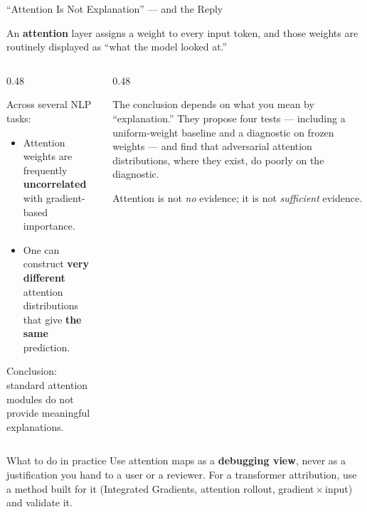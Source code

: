 \begin{frame}{``Attention Is Not Explanation'' --- and the Reply}

    {\scriptsize An \textbf{attention} layer assigns a weight to every input token, and those weights
    are routinely displayed as ``what the model looked at.''}

    \begin{columns}[T]
        \begin{column}{0.48\textwidth}
            \begin{tcolorbox}[colback=raiRed!5, colframe=raiRed!70,
                              title=Jain \& Wallace (NAACL 2019)]
                \scriptsize
                Across several NLP tasks:
                \begin{itemize}
                    \item Attention weights are frequently \textbf{uncorrelated} with
                          gradient-based importance.
                    \item One can construct \textbf{very different} attention distributions that
                          give \textbf{the same} prediction.
                \end{itemize}
                Conclusion: standard attention modules do not provide meaningful explanations.
            \end{tcolorbox}
        \end{column}
        \begin{column}{0.48\textwidth}
            \begin{tcolorbox}[colback=raiBlue!5, colframe=raiBlue!60,
                              title=Wiegreffe \& Pinter (EMNLP 2019)]
                \scriptsize
                The conclusion depends on what you mean by ``explanation.'' They propose four
                tests --- including a uniform-weight baseline and a diagnostic on frozen
                weights --- and find that adversarial attention distributions, where they exist,
                do poorly on the diagnostic.

                \vspace{0.3em}
                Attention is not \emph{no} evidence; it is not \emph{sufficient} evidence.
            \end{tcolorbox}
        \end{column}
    \end{columns}

    \begin{block}{What to do in practice}
        \centering
        \scriptsize Use attention maps as a \textbf{debugging view}, never as a justification you
        hand to a user or a reviewer. For a transformer attribution, use a method built for it (Integrated
        Gradients, attention rollout, gradient\,$\times$\,input) and validate it.
    \end{block}


\end{frame}
